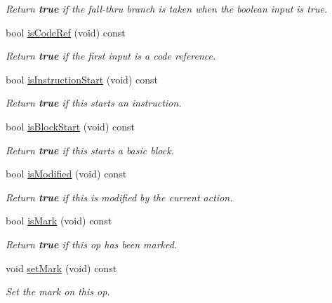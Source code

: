 \begin{DoxyCompactItemize}
\begin{DoxyCompactList}\small\item\em Return {\bfseries{true}} if the fall-\/thru branch is taken when the boolean input is true. \end{DoxyCompactList}\item 
bool \mbox{\hyperlink{class_pcode_op_a44e7e2be61889bbee3efe0ef5d0d0ca3}{is\+Code\+Ref}} (void) const
\begin{DoxyCompactList}\small\item\em Return {\bfseries{true}} if the first input is a code reference. \end{DoxyCompactList}\item 
bool \mbox{\hyperlink{class_pcode_op_a9dd35f409dc0f1e1100c2654b92d51af}{is\+Instruction\+Start}} (void) const
\begin{DoxyCompactList}\small\item\em Return {\bfseries{true}} if this starts an instruction. \end{DoxyCompactList}\item 
bool \mbox{\hyperlink{class_pcode_op_af45c57119fdb3b96af3638cfbe89eddc}{is\+Block\+Start}} (void) const
\begin{DoxyCompactList}\small\item\em Return {\bfseries{true}} if this starts a basic block. \end{DoxyCompactList}\item 
bool \mbox{\hyperlink{class_pcode_op_a69de98933ac9ef0e859c45d1462922a9}{is\+Modified}} (void) const
\begin{DoxyCompactList}\small\item\em Return {\bfseries{true}} if this is modified by the current action. \end{DoxyCompactList}\item 
bool \mbox{\hyperlink{class_pcode_op_a4b101f4003977788f722635bd987c4eb}{is\+Mark}} (void) const
\begin{DoxyCompactList}\small\item\em Return {\bfseries{true}} if this op has been marked. \end{DoxyCompactList}\item 
void \mbox{\hyperlink{class_pcode_op_a293188b0efd0a693124eec0d26a18483}{set\+Mark}} (void) const
\begin{DoxyCompactList}\small\item\em Set the mark on this op. \end{DoxyCompactList}\item 

\end{DoxyCompactItemize}
